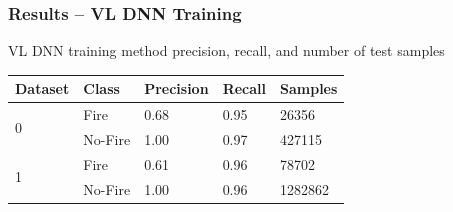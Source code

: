 \documentclass{beamer}
\begin{document}
\begin{frame}
  \frametitle{Results -- VL DNN Training}
  \footnotesize

\begin{table}
\centering

   \scriptsize
VL DNN training method precision, recall, and number of test samples
   \\
    \label{tbl:dnn_results_vl}
\begin{tabular}{ |l|l|l|l|l| }
 \hline
Dataset & Class & Precision & Recall  & Samples \\ \hline
\multirow{2}{*}{0} 
 & Fire & 0.68 & 0.95 & 26356\\
 & No-Fire & 1.00 & 0.97 & 427115\\ 
 \hline

\multirow{2}{*}{1} 
& Fire & 0.61 & 0.96 & 78702\\
 & No-Fire & 1.00 & 0.96 & 1282862\\
\hline
\end{tabular}
\end{table}


  \vspace{-0.2cm}
\begin{figure}[ht]
\scriptsize
{}
\hspace{0.1cm}%
\hspace{0.1cm}%

\label{fig:map_dnn_vl}
\end{figure}


\end{frame}
\end{document}
